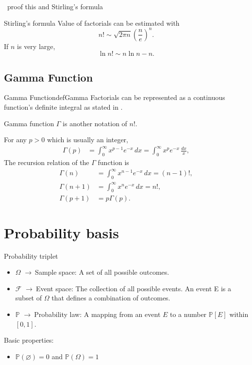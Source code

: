 \documentclass[11pt,a4paper,fleqn]{article}
\numberwithin{equation}{section}
\newcommand{\g}{$\rightarrow\ $}
\newcommand{\TODO}{\textcolor{ErrorRed}{\fbox{TODO}}\ }
\begin{document}
\TODO proof this and Stirling's formula

\begin{fact}{Stirling's formula}{}
    Value of factorials can be estimated with
    \begin{equation*}
        n!\sim \sqrt{2\pi n}\left(\frac{n}{e}\right)^n.
    \end{equation*}
    If $n$ is very large,
    \begin{equation*}
        \ln n! \sim n\ln n -n.
    \end{equation*}
\end{fact}

\subsection{Gamma Function}

\begin{fact}{Gamma Function}{defGamma}
    Factorials can be represented as a continuous function's definite integral as stated in .
    
    Gamma function $\Gamma$ is another notation of $n!$.
    
    For any $p>0$ which is usually an integer,
    \begin{align*}
        \Gamma(p)&=\int_{0}^{\infty}x^{p-1}e^{-x}\,dx = \int_{0}^{\infty} x^{p}e^{-x}\,\frac{dx}{x},
    \end{align*}
    The recursion relation of the $\Gamma$ function is
    \begin{align*}
        \Gamma(n)&=\int_{0}^{\infty}x^{n-1}e^{-x}\,dx=(n-1)!,\\
        \Gamma(n+1)&=\int_{0}^{\infty}x^{n}e^{-x}\,dx = n!,\\
        \Gamma(p+1)&=p\Gamma(p).
    \end{align*}
\end{fact}

\section{Probability basis}

\begin{fact}{Probability triplet}{}
    \begin{itemize}
        \item $\Omega$ \g Sample space: A set of all possible outcomes.
        \item $\mathcal{F}$ \g Event space: The collection of all  possible events. An event E is a subset of $\Omega$ that defines a combination of outcomes.
        \item $\mathbb{P}$ \g Probability law: A mapping from an event $E$ to a number $\mathbb{P}[E]$ within $[0,1]$.
    \end{itemize}
    Basic properties:
    \begin{itemize}
        \item $\mathbb{P}(\varnothing)=0$ and $\mathbb{P}(\Omega)=1$
    \end{itemize}
\end{fact}
\end{document}
